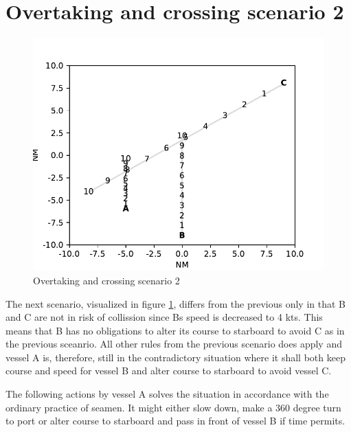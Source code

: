 \section{Overtaking and crossing scenario 2}%

\begin{figure}[h]
    \centering
    \includegraphics[width=\textwidth,height=0.75\textheight,keepaspectratio]{Figures/Scenario/overtaking-and-crossing-3.pdf}
    \caption{Overtaking and crossing scenario 2 \cite{ecolreg_overtaking-and-crossing-3}}
    \label{fig:overtaking-and-crossing-3}
\end{figure}
The next scenario, visualized in figure \ref{fig:overtaking-and-crossing-3}, differs from the previous only in that B and C are not in risk of collission since Bs speed is decreased to 4 kts. This means that B has no obligations to alter its course to starboard to avoid C as in the previous sceanrio. All other rules from the previous scenario does apply and vessel A is, therefore, still in the contradictory situation where it shall both keep course and speed for vessel B and alter course to starboard to avoid vessel C.

The following actions by vessel A solves the situation in accordance with the ordinary practice of seamen. It might either slow down, make a 360 degree turn to port or alter course to starboard and pass in front of vessel B if time permits.



